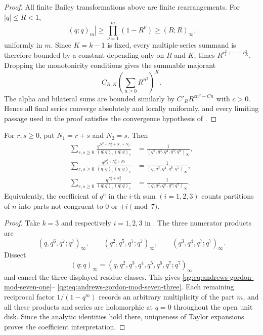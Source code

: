 \begin{proof}
All finite Bailey transformations above are finite rearrangements.  For
\(|q|\le R<1\),
\[
  |(q;q)_m|
  \ge\prod_{\nu=1}^{m}(1-R^\nu)
  \ge(R;R)_\infty,
\]
uniformly in \(m\).  Since \(K=k-1\) is fixed, every multiple-series
summand is therefore bounded by a constant depending only on \(R\) and
\(K\), times \(R^{r_1^2+\cdots+r_K^2}\).  Dropping the monotonicity
conditions gives the summable majorant
\[
  C_{R,K}\left(\sum_{n\ge0}R^{n^2}\right)^K.
\]
The alpha and bilateral sums are bounded similarly by
\(C'_R R^{c n^2-Cn}\) with \(c>0\).  Hence all final series converge
absolutely and locally uniformly, and every limiting passage used in the
proof satisfies the convergence hypothesis of
.
\end{proof}

\begin{corollary}
\label{qg:cor-andrews-gordon-mod7}
For \(r,s\ge0\), put \(N_1=r+s\) and \(N_2=s\).  Then
\begin{align}
 \sum_{r,s\ge0}
 \frac{q^{N_1^2+N_2^2+N_1+N_2}}
      {(q;q)_r(q;q)_s}
 &=
 \frac1{(q^2,q^3,q^4,q^5;q^7)_\infty},
 \label{qg:eq:andrews-gordon-mod-seven-one}\\
 \sum_{r,s\ge0}
 \frac{q^{N_1^2+N_2^2+N_2}}
      {(q;q)_r(q;q)_s}
 &=
 \frac1{(q,q^3,q^4,q^6;q^7)_\infty},
 \label{qg:eq:andrews-gordon-mod-seven-two}\\
 \sum_{r,s\ge0}
 \frac{q^{N_1^2+N_2^2}}
      {(q;q)_r(q;q)_s}
 &=
 \frac1{(q,q^2,q^5,q^6;q^7)_\infty}.
 \label{qg:eq:andrews-gordon-mod-seven-three}
\end{align}
Equivalently, the coefficient of \(q^n\) in the \(i\)-th sum
\((i=1,2,3)\) counts partitions of \(n\) into parts not congruent to
\(0\) or \(\pm i\pmod7\).
\end{corollary}

\begin{proof}
Take \(k=3\) and respectively \(i=1,2,3\) in
.  The three numerator products are
\[
 (q,q^6,q^7;q^7)_\infty,\qquad
 (q^2,q^5,q^7;q^7)_\infty,\qquad
 (q^3,q^4,q^7;q^7)_\infty.
\]
Dissect
\[
 (q;q)_\infty=(q,q^2,q^3,q^4,q^5,q^6,q^7;q^7)_\infty
\]
and cancel the three displayed residue classes.  This gives
\eqref{qg:eq:andrews-gordon-mod-seven-one}--
\eqref{qg:eq:andrews-gordon-mod-seven-three}.  Each remaining reciprocal
factor \(1/(1-q^m)\) records an arbitrary multiplicity of the part \(m\),
and all these products and series are holomorphic at \(q=0\) throughout
the open unit disk.  Since the analytic identities hold there, uniqueness
of Taylor expansions proves the coefficient interpretation.
\end{proof}

